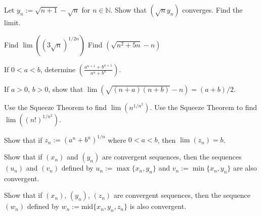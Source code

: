 \documentclass[paper=a4, fontsize=11pt]{scrartcl} %
\numberwithin{equation}{section} %
\numberwithin{figure}{section} %
\numberwithin{table}{section} %
\begin{document}
 Let $y_n := \sqrt{n+1} - \sqrt{n}$ for $n \in \mathbb{N}$. Show that $(\sqrt{n} y_n)$ converges. Find the limit.
\pf

 Find $\lim\left((3\sqrt{n})^{1/2n}\right)$
\pf
{} Find $(\sqrt{n^2 + 5n} - n)$
\pf

\newcommand{\anp}{a^{n+1}}
\newcommand{\bnp}{b^{n+1}}
 If $0 < a < b$, determine $\left(\frac{\anp + \bnp}{a^n + b^n}\right)$.
\pf

 If $a > 0$, $b > 0$, show that $\lim\left(\sqrt{(n+a)(n+b)} - n\right) = (a + b)/2$.
\pf

 Use the Squeeze Theorem to find $\lim(n^{1/n^2})$.
\pf
{} Use the Squeeze Theorem to find $\lim((n!)^{1/n^2})$.
\pf

 Show that if $z_n := (a^n + b^n)^{1/n}$ where $0 < a < b$, then $\lim(z_n) = b$.
\pf

 Show that if $(x_n)$ and $(y_n)$ are convergent sequences, then the sequences $(u_n)$ and $(v_n)$ defined by $u_n := \max\{x_n, y_n\}$ and $v_n := \min\{x_n, y_n\}$ are also convergent.
\pf

 Show that if $(x_n)$, $(y_n)$, $(z_n)$ are convergent sequences, then the sequence $(w_n)$ defined by $w_n := \text{mid}\{x_n, y_n, z_n\}$ is also convergent.
\pf
\end{document}
